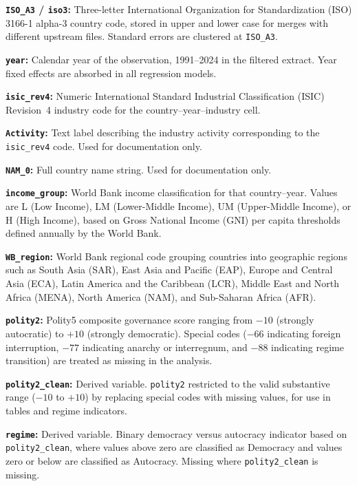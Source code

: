 \documentclass[12pt,letterpaper]{article}
\begin{document}
\medskip

\noindent\textbf{\texttt{ISO\_A3} / \texttt{iso3}:}
Three-letter International Organization for Standardization (ISO) 3166-1 alpha-3 country code, stored in upper and lower case for merges with different upstream files. Standard errors are clustered at \texttt{ISO\_A3}.

\noindent\textbf{\texttt{year}:}
Calendar year of the observation, 1991--2024 in the filtered extract. Year fixed effects are absorbed in all regression models.

\noindent\textbf{\texttt{isic\_rev4}:}
Numeric International Standard Industrial Classification (ISIC) Revision~4 industry code for the country--year--industry cell.

\noindent\textbf{\texttt{Activity}:}
Text label describing the industry activity corresponding to the \texttt{isic\_rev4} code. Used for documentation only.

\noindent\textbf{\texttt{NAM\_0}:}
Full country name string. Used for documentation only.

\noindent\textbf{\texttt{income\_group}:}
World Bank income classification for that country--year. Values are L (Low Income), LM (Lower-Middle Income), UM (Upper-Middle Income), or H (High Income), based on Gross National Income (GNI) per capita thresholds defined annually by the World Bank.

\noindent\textbf{\texttt{WB\_region}:}
World Bank regional code grouping countries into geographic regions such as South Asia (SAR), East Asia and Pacific (EAP), Europe and Central Asia (ECA), Latin America and the Caribbean (LCR), Middle East and North Africa (MENA), North America (NAM), and Sub-Saharan Africa (AFR).

\noindent\textbf{\texttt{polity2}:}
Polity5 composite governance score ranging from $-10$ (strongly autocratic) to $+10$ (strongly democratic). Special codes ($-66$ indicating foreign interruption, $-77$ indicating anarchy or interregnum, and $-88$ indicating regime transition) are treated as missing in the analysis.

\noindent\textbf{\texttt{polity2\_clean}:}
Derived variable. \texttt{polity2} restricted to the valid substantive range ($-10$ to $+10$) by replacing special codes with missing values, for use in tables and regime indicators.

\noindent\textbf{\texttt{regime}:}
Derived variable. Binary democracy versus autocracy indicator based on \texttt{polity2\_clean}, where values above zero are classified as Democracy and values zero or below are classified as Autocracy. Missing where \texttt{polity2\_clean} is missing.
\end{document}
